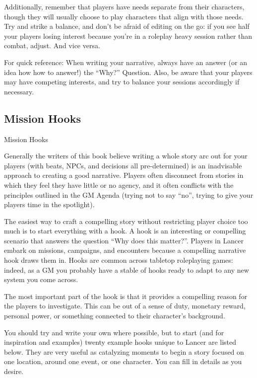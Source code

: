 Additionally, remember that players have needs separate from their characters, though they will
usually choose to play characters that align with those needs. Try and strike a balance, and don’t
be afraid of editing on the go: if you see half your players losing interest because you’re in a
roleplay heavy session rather than combat, adjust. And vice versa.


For quick reference: When writing your narrative, always have an answer (or an idea how how to
answer!) the ``Why?'' Question. Also, be aware that your players may have competing interests,
and try to balance your sessions accordingly if necessary.



\subsection{Mission Hooks}

                                           Mission Hooks

Generally the writers of this book believe writing a whole story arc out for your players (with
beats, NPCs, and decisions all pre-determined) is an inadvisable approach to creating a good
narrative. Players often disconnect from stories in which they feel they have little or no agency,
and it often conflicts with the principles outlined in the GM Agenda (trying not to say ``no'', trying
to give your players time in the spotlight).


The easiest way to craft a compelling story without restricting player choice too much is to start
everything with a hook. A hook is an interesting or compelling scenario that answers the
question ``Why does this matter?''. Players in Lancer embark on missions, campaigns, and
encounters because a compelling narrative hook draws them in. Hooks are common across
tabletop roleplaying games: indeed, as a GM you probably have a stable of hooks ready to adapt
to any new system you come across.


The most important part of the hook is that it provides a compelling reason for the players
to investigate. This can be out of a sense of duty, monetary reward, personal power, or
something connected to their character’s background.


You should try and write your own where possible, but to start (and for inspiration and examples)
twenty example hooks unique to Lancer are listed below. They are very useful as catalyzing
moments to begin a story focused on one location, around one event, or one character. You can
fill in details as you desire.



